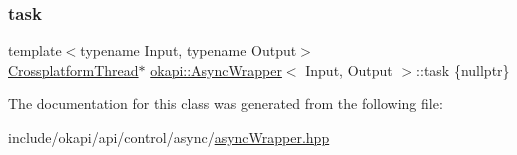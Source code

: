 \mbox{\label{classokapi_1_1AsyncWrapper_a8956664e9b8e52e9437a9129df141d5b}} 
\subsubsection{\texorpdfstring{task}{task}}
{\footnotesize\ttfamily template$<$typename Input, typename Output$>$ \\
\mbox{\hyperlink{classCrossplatformThread}{Crossplatform\+Thread}}$\ast$ \mbox{\hyperlink{classokapi_1_1AsyncWrapper}{okapi\+::\+Async\+Wrapper}}$<$ Input, Output $>$\+::task \{nullptr\}\hspace{0.3cm}{\ttfamily [protected]}}



The documentation for this class was generated from the following file\+:\begin{DoxyCompactItemize}
\item 
include/okapi/api/control/async/\mbox{\hyperlink{asyncWrapper_8hpp}{async\+Wrapper.\+hpp}}\end{DoxyCompactItemize}
